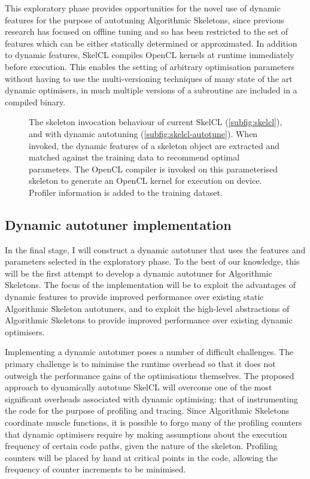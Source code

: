This exploratory phase provides opportunities for the novel use of
dynamic features for the purpose of autotuning Algorithmic Skeletons,
since previous research has focused on offline tuning and so has been
restricted to the set of features which can be either statically
determined or approximated. In addition to dynamic features, SkelCL
compiles OpenCL kernels at runtime immediately before execution. This
enables the setting of arbitrary optimisation parameters without
having to use the multi-versioning techniques of many state of the art
dynamic optimisers, in much multiple versions of a subroutine are
included in a compiled binary.

\begin{figure}[t]
\centering

\caption{The skeleton invocation behaviour of current SkelCL
  (\ref{subfig:skelcl}), and with dynamic autotuning
  (\ref{subfig:skelcl-autotune}). When invoked, the dynamic features
  of a skeleton object are extracted and matched against the training
  data to recommend optimal parameters. The OpenCL compiler is invoked
  on this parameterised skeleton to generate an OpenCL kernel for
  execution on device. Profiler information is added to the training
  dataset.}
\label{fig:method}
\end{figure}

\subsection{Dynamic autotuner implementation}
In the final stage, I will construct a dynamic autotuner that uses the
features and parameters selected in the exploratory phase. To the best
of our knowledge, this will be the first attempt to develop a dynamic
autotuner for Algorithmic Skeletons. The focus of the implementation
will be to exploit the advantages of dynamic features to provide
improved performance over existing static Algorithmic Skeleton
autotuners, and to exploit the high-level abstractions of Algorithmic
Skeletons to provide improved performance over existing dynamic
optimisers.

Implementing a dynamic autotuner poses a number of difficult
challenges. The primary challenge is to minimise the runtime overhead
so that it does not outweigh the performance gains of the
optimisations themselves. The proposed approach to dynamically
autotune SkelCL will overcome one of the most significant overheads
associated with dynamic optimising: that of instrumenting the code for
the purpose of profiling and tracing. Since Algorithmic Skeletons
coordinate muscle functions, it is possible to forgo many of the
profiling counters that dynamic optimisers require by making
assumptions about the execution frequency of certain code paths, given
the nature of the skeleton. Profiling counters will be placed by hand
at critical points in the code, allowing the frequency of counter
increments to be minimised.


